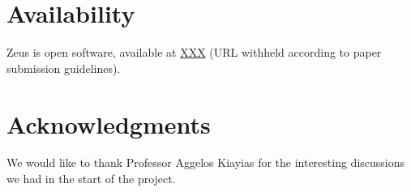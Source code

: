 \documentclass[letterpaper,10pt]{article}
\begin{document}
\section{Availability}

Zeus is open software, available at \url{XXX} (URL withheld according
to paper submission guidelines).

\section{Acknowledgments}

We would like to thank Professor Aggelos Kiayias for the interesting
discussions we had in the start of the project.

{\footnotesize


}
\end{document}
